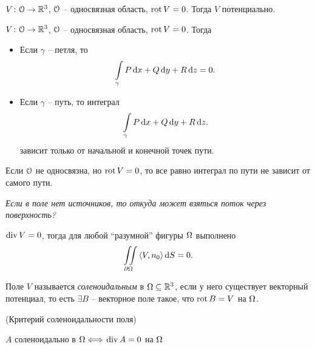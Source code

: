 \begin{remark}
    $V \colon \mathcal{O} \to \mathbb{R}^3$, $\mathcal{O}$ -- односвязная область, $\operatorname{rot} V = 0$. Тогда $V$ потенциально.
\end{remark}

\begin{remark}
    $V \colon \mathcal{O} \to \mathbb{R}^3$, $\mathcal{O}$ -- односвязная область, $\operatorname{rot} V = 0$. Тогда
    \begin{itemize}
        \item Если $\gamma$ -- петля, то
\[
    \int\limits_{\gamma}{P \,\mathrm{d} x + Q \,\mathrm{d} y + R \,\mathrm{d} z} = 0
.\] 
        \item Если $\gamma$ -- путь, то интеграл
\[
    \int\limits_{\gamma}{P \,\mathrm{d} x + Q \,\mathrm{d} y + R \,\mathrm{d} z}
.\] 
            зависит только от начальной и конечной точек пути.
    \end{itemize} 
\end{remark}

\begin{remark}
    Если $\mathcal{O}$ не односвязна, но $\operatorname{rot} V = 0$, то все равно интеграл по пути
    не зависит от самого пути.
\end{remark}

\textit{Если в поле нет источников, то откуда может взяться поток через поверхность?}
\begin{remark}
    $\operatorname{div} V = 0$, тогда для любой ``разумной'' фигуры $\Omega$ выполнено
\[
    \iint\limits_{\partial \Omega}{\langle V, n_0 \rangle \,\mathrm{d} S} = 0
.\] 
\end{remark}

\begin{definition}
    Поле $V$ называется \textit{соленоидальным} в $\Omega \subseteq \mathbb{R}^3$, 
    если у него существует векторный потенциал, то есть
    $\exists B$ -- векторное поле такое, что $\operatorname{rot} B = V$ на $\Omega$.
\end{definition}

\begin{theorem}(Критерий соленоидальности поля)
    
    $A$ соленоидально в $\Omega \Longleftrightarrow$ $\operatorname{div} A = 0$ на $\Omega$
\end{theorem}
